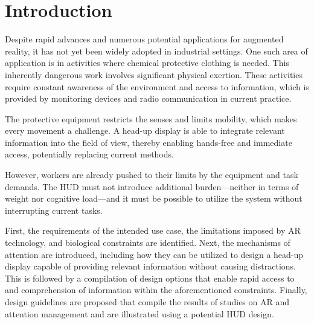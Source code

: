 \cleardoublepage

\section{Introduction}


Despite rapid advances and numerous potential applications for augmented reality, it has not yet been widely adopted in industrial settings.
One such area of application is in activities where chemical protective clothing is needed. This inherently dangerous work involves significant physical exertion.
These activities require constant awareness of the environment and access to information, which is provided by monitoring devices and radio communication in current practice.

The protective equipment restricts the senses and limits mobility, which makes every movement a challenge.
A head-up display is able to integrate relevant information into the field of view, thereby enabling hands-free and immediate access, potentially replacing current methods.

However, workers are already pushed to their limits by the equipment and task demands. The HUD must not introduce additional burden—neither in terms of weight nor cognitive load—and it must be possible to utilize the system without interrupting current tasks.



First, the requirements of the intended use case, the limitations imposed by AR technology, and biological constraints are identified. 
Next, the mechanisms of attention are introduced, including how they can be utilized to design a head-up display capable of providing relevant information without causing distractions.
This is followed by a compilation of design options that enable rapid access to and comprehension of information within the aforementioned constraints.
Finally, design guidelines are proposed that compile the results of studies on AR and attention management and are illustrated using a potential HUD design.


